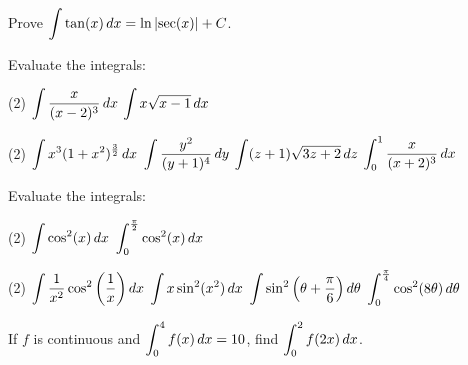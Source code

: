 \documentclass[mathNotesPreamble]{subfiles}
\begin{document}
  \begin{ex*}
    Prove $\displaystyle\int \tan(x)\,dx=\ln{\left\vert\sec(x)\right\vert}+C$.
  \end{ex*}
  \begin{ex*}
    Evaluate the integrals:
  \end{ex*}
  \begin{tasks}[after-item-skip=\stretch{1}](2)
    \task $\displaystyle\int \frac{x}{(x-2)^3}\,dx$
    \task $\displaystyle\int x\sqrt{x-1}\,dx$
  \end{tasks}
  \pagebreak
  
  \begin{tasks}[after-item-skip=\stretch{1}, resume](2)
    \task $\displaystyle\int x^3(1+x^2)^\frac{3}{2}\,dx$
    \task $\displaystyle\int \frac{y^2}{(y+1)^4}\,dy$
    \task $\displaystyle\int (z+1)\sqrt{3z+2}\,dz$
    \task $\displaystyle\int_0^1 \frac{x}{(x+2)^3}\,dx$
  \end{tasks}
  \pagebreak

  \begin{center}
  \end{center}
  \begin{ex*}
    Evaluate the integrals:
  \end{ex*}
  \begin{tasks}[after-item-skip=\stretch{1}](2)
    \task $\displaystyle\int \cos^2(x)\,dx$
    \task $\displaystyle\int_{0}^{\frac{\pi}{2}}\cos^2(x)\,dx$
  \end{tasks}
  \pagebreak
  
  \begin{tasks}[after-item-skip=\stretch{1}, resume](2)
    \task $\displaystyle\int \frac{1}{x^2}\cos^2{\left(\frac{1}{x}\right)}\,dx$
    \task $\displaystyle\int x\sin^2(x^2)\,dx$
    \task $\displaystyle\int \sin^2{\left(\theta+\frac{\pi}{6}\right)}\,d\theta$
    \task $\displaystyle\int_{0}^{\frac{\pi}{4}} \cos^2(8\theta)\,d\theta$
  \end{tasks}
  \pagebreak
  
  \begin{ex*}
    If $f$ is continuous and $\displaystyle\int_0^4 f(x)\,dx=10$, find $\displaystyle\int_0^2 f(2x)\,dx$.
  \end{ex*}
  
\end{document}
